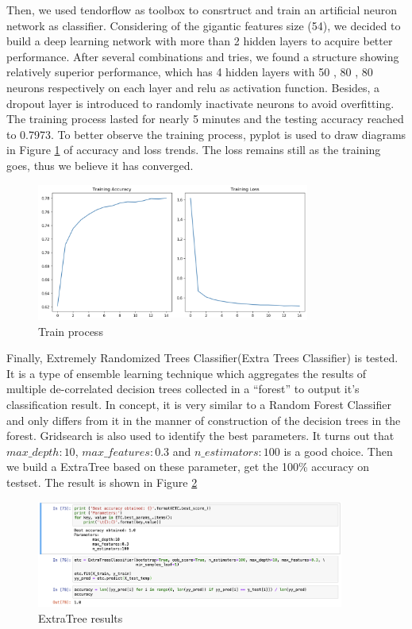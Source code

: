 \documentclass[11pt,en]{elegantpaper}
\begin{document}
Then, we used tendorflow as toolbox to consrtruct and train an artificial neuron network as classifier. Considering of the gigantic features size (54), we decided to build a deep learning network with more than 2 hidden layers to acquire better performance. After several combinations and tries, we found a structure showing relatively superior performance, which has 4 hidden layers with 50 , 80 , 80 neurons respectively on each layer and relu as activation function. Besides, a dropout layer is introduced to randomly inactivate neurons to avoid overfitting.
The training process lasted for nearly 5 minutes and the testing accuracy reached to 0.7973. To better observe the training process, pyplot is used to draw diagrams in Figure \ref{train} of accuracy and loss trends. The loss remains still as the training goes, thus we believe it has converged.
\begin{figure}[h]
	\centering
	\includegraphics[width=0.8\textwidth]{image/train.png}
	\caption{Train process}
	\label{train}
\end{figure}

Finally, Extremely Randomized Trees Classifier(Extra Trees Classifier) is tested. It is a type of ensemble learning technique which aggregates the results of multiple de-correlated decision trees collected in a “forest” to output it’s classification result. In concept, it is very similar to a Random Forest Classifier and only differs from it in the manner of construction of the decision trees in the forest.
Gridsearch is also used to identify the best parameters. It turns out that $max\_depth:10$, $max\_features:0.3$ and $n\_estimators:100$ is a good choice. Then we build a ExtraTree based on these parameter, get the 100\% accuracy on testset. The result is shown in Figure \ref{extra}
\begin{figure}[h]
	\centering
	\includegraphics[width=0.9\textwidth]{image/image-20200523235825150.png}
	\caption{ExtraTree results}
	\label{extra}
\end{figure}
\end{document}
